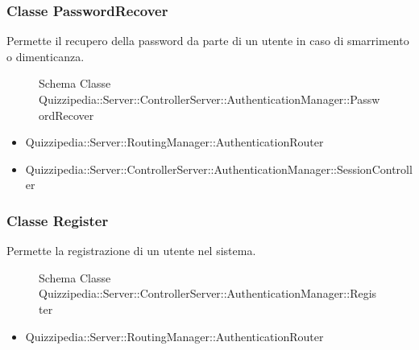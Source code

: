 \subsubsection{Classe PasswordRecover}
Permette il recupero della password da parte di un utente in caso di smarrimento o dimenticanza.
\begin{figure}[H]
\centering
\noindent{}
\caption[Schema Classe PasswordRecover]{Schema Classe Quizzipedia::Server::ControllerServer::AuthenticationManager::PasswordRecover}
\end{figure}
\begin{itemize}
\item Quizzipedia::Server::RoutingManager::AuthenticationRouter
\end{itemize}
\begin{itemize}
\item Quizzipedia::Server::ControllerServer::AuthenticationManager::SessionController
\end{itemize}
\subsubsection{Classe Register}
Permette la registrazione di un utente nel sistema.
\begin{figure}[H]
\centering
\noindent{}
\caption[Schema Classe Register]{Schema Classe Quizzipedia::Server::ControllerServer::AuthenticationManager::Register}
\end{figure}
\begin{itemize}
\item Quizzipedia::Server::RoutingManager::AuthenticationRouter
\end{itemize}
